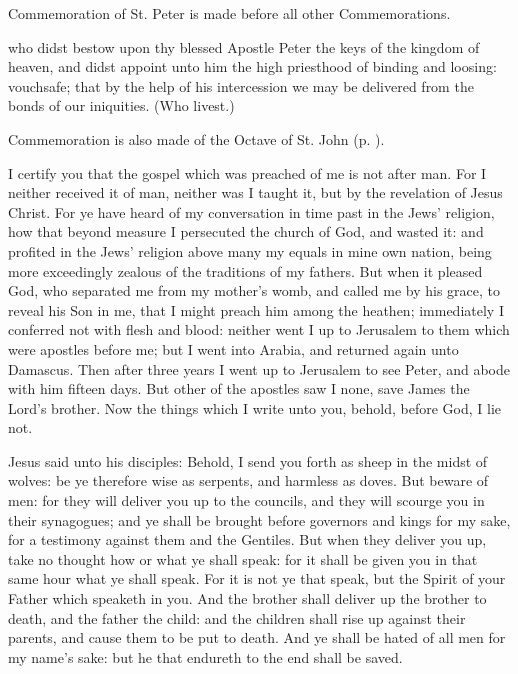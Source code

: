 \begin{rubric}
	Commemoration of St. Peter is made before all other Commemorations.
\end{rubric}

 who didst bestow upon thy blessed Apostle Peter the keys of the kingdom of heaven, and didst  appoint unto him the high priesthood of binding and loosing: vouchsafe; that by the help of his intercession we may be delivered from the bonds of our iniquities. (Who livest.)
\begin{rubric}
	Commemoration is also made of the Octave of St. John (p. \pageref{JohnCollect}).
\end{rubric}

 I certify you that the gospel which was preached of me is not after man. For I neither received it of man, neither was I taught it, but by the revelation of Jesus Christ. For ye have heard of my conversation in time past in the Jews' religion, how that beyond measure I persecuted the church of God, and wasted it: and profited in the Jews' religion above many my equals in mine own nation, being more exceedingly zealous of the traditions of my fathers. But when it pleased God, who separated me from my mother’s womb, and called me by his grace, to reveal his Son in me, that I might preach him among the heathen; immediately I conferred not with flesh and blood: neither went I up to Jerusalem to them which were apostles before me; but I went into Arabia, and returned again unto Damascus. Then after three years I went up to Jerusalem to see Peter, and abode with him fifteen days. But other of the apostles saw I none, save James the Lord’s brother. Now the things which I write unto you, behold, before God, I lie not.


 Jesus said unto his disciples: Behold, I send you forth as sheep in the midst of wolves: be ye therefore wise as serpents, and harmless as doves. But beware of men: for they will deliver you up to the councils, and they will scourge you in their synagogues; and ye shall be brought before governors and kings for my sake, for a testimony against them and the Gentiles. But when they deliver you up, take no thought how or what ye shall speak: for it shall be given you in that same hour what ye shall speak. For it is not ye that speak, but the Spirit of your Father which speaketh in you. And the brother shall deliver up the brother to death, and the father the child: and the children shall rise up against their parents, and cause them to be put to death. And ye shall be hated of all men for my name's sake: but he that endureth to the end shall be saved. 

